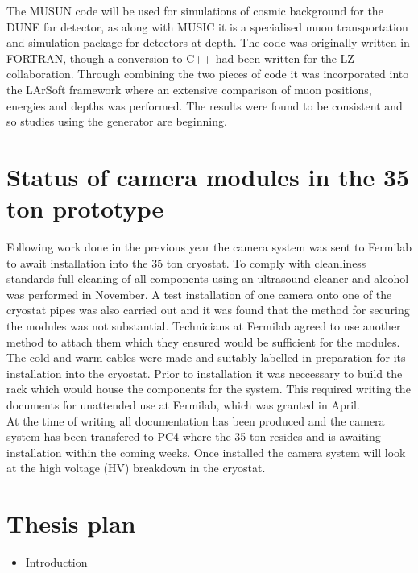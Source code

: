 \documentclass[11pt]{report} %
\begin{document}
{The MUSUN code will be used for simulations of cosmic background for the DUNE far detector, as along with MUSIC it is a specialised muon transportation and simulation package for detectors at depth. The code was originally written in FORTRAN, though a conversion to C++ had been written for the LZ collaboration. Through combining the two pieces of code it was incorporated into the LArSoft framework where an extensive comparison of muon positions, energies and depths was performed. The results were found to be consistent and so studies using the generator are beginning.\\

\section{Status of camera modules in the 35 ton prototype}
Following work done in the previous year the camera system was sent to Fermilab to await installation into the 35 ton cryostat. To comply with cleanliness standards full cleaning of all components using an ultrasound cleaner and alcohol was performed in November. A test installation of one camera onto one of the cryostat pipes was also carried out and it was found that the method for securing the modules was not substantial. Technicians at Fermilab agreed to use another method to attach them which they ensured would be sufficient for the modules. \\

The cold and warm cables were made and suitably labelled in preparation for its installation into the cryostat. Prior to installation it was neccessary to build the rack which would house the components for the system. This required writing the documents for unattended use at Fermilab, which was granted in April. \\

At the time of writing all documentation has been produced and the camera system has been transfered to PC4 where the 35 ton resides and is awaiting installation within the coming weeks. Once installed the camera system will look at the high voltage (HV) breakdown in the cryostat. 

\newpage

\section{Thesis plan}
\begin{itemize}

\item Introduction
  

\end{itemize}}
\end{document}
